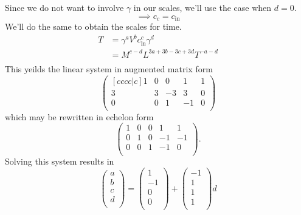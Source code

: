 \documentclass[12pt,twoside]{article}
\begin{document}
Since we do not want to involve $\gamma$ in our scales, we'll use the case when
$d=0$.
\begin{equation*}
  \implies c_c = c_{\text{in}}
\end{equation*}
We'll do the same to obtain the scales for time.
\begin{equation*}
  \begin{aligned}
    T &= \gamma^aV^bc_{\text{in}}^c\gamma^d \\
    &= M^{c-d}L^{3a+3b-3c+3d}T^{-a-d} \\
  \end{aligned}
\end{equation*}
This yeilds the linear system in augmented matrix form
\begin{equation*}
  \begin{pmatrix}[cccc|c]
    1 & 0 & 0 & 1 & 1 \\
    3 & 3 & -3 & 3 & 0 \\
    0 & 0 & 1 & -1 & 0 \\
  \end{pmatrix}
\end{equation*}
which may be rewritten in echelon form
\begin{equation*}
  \begin{pmatrix}
    1 & 0 & 0 & 1 & 1 \\
    0 & 1 & 0 & -1 & -1 \\
    0 & 0 & 1 & -1 & 0 \\
  \end{pmatrix}.
\end{equation*}
Solving this system results in
\begin{equation*}
  \begin{pmatrix}
    a \\ b \\ c \\ d \\
  \end{pmatrix} =
  \begin{pmatrix}
    1 \\ -1 \\ 0 \\ 0 \\
  \end{pmatrix} +
  \begin{pmatrix}
    -1 \\ 1 \\ 1 \\ 1 \\
  \end{pmatrix}d
\end{equation*}
\end{document}
